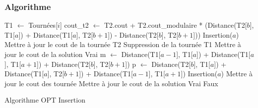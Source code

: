 \documentclass{article}
\begin{document}
\subsubsection{Algorithme}
\begin{algorithm}[H]
  {
    T1 $\leftarrow$ Tournées[$i$]\;
    {
      {
        {
          {
            cout\_t2 $\leftarrow$ T2.cout + T2.cout\_modulaire * (Distance(T2[$b$], T1[$a$]) + Distance(T1[$a$], T2[$b + 1$]) - Distance(T2[$b$], T2[$b + 1$]))\;
            {
              Insertion($a$)\;
              Mettre à jour le cout de la tournée T2\;
              Suppression de la tournée T1\;
              Mettre à jour le cout de la solution\;
              \Return Vrai\;
            }
          }
        }
        \Else
        {
          {
            {
              m $\leftarrow$ Distance(T1[$a - 1$], T1[$a$]) + Distance(T1[$a$], T1[$a + 1$]) + Distance(T2[$b$], T2[$b + 1$])\;
              p $\leftarrow$ Distance(T2[$b$], T1[$a$]) + Distance(T1[$a$], T2[$b + 1$]) + Distance(T1[$a - 1$], T1[$a + 1$])\;
              {
                Insertion($a$)\;
                Mettre à jour le cout des tournée\;
                Mettre à jour le cout de la solution\;
                \Return Vrai\;
              }
            }
          }
        }
      }
    }
  }
  \Return Faux\;
  \caption{Algorithme OPT Insertion}
\end{algorithm}
\end{document}
